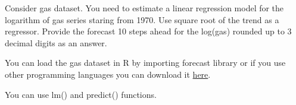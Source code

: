 
\begin{question}
Consider gas dataset. You need to estimate a linear regression model for the logarithm of gas series staring from 1970. Use square root of the trend as a regressor. Provide the forecast 10 steps ahead for the log(gas) rounded up to 3 decimal digits as an answer.

You can load the gas dataset in R by importing forecast library or if you use other programming languages you can download it \href{https://github.com/vincentarelbundock/Rdatasets/blob/master/csv/forecast/gas.csv}{here}.
\end{question}

\begin{solution}
You can use lm() and predict() functions.
\end{solution}

